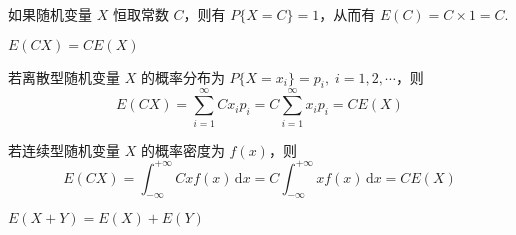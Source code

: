 \begin{myproof}
    如果随机变量 $X$ 恒取常数 $C$，则有 $P\{X=C\}=1$，从而有 $E(C) = C \times 1 = C$.
\end{myproof}

\begin{property} \label{property:E(CX)=CE(X)}
    $E(CX)=CE(X)$
\end{property}

\begin{myproof}
    若离散型随机变量 $X$ 的概率分布为 $P\{X=x_i\}=p_i, \; i=1,2,\cdots$，则
    $$
    E(CX) = \sum_{i=1}^{\infty} C x_i p_i = C \sum_{i=1}^{\infty} x_i p_i = CE(X)
    $$

    若连续型随机变量 $X$ 的概率密度为 $f(x)$，则
    $$
    E(CX) = \int_{-\infty}^{+\infty} Cx f(x) \, \text{d}x = C \int_{-\infty}^{+\infty} x f(x) \, \text{d}x = CE(X)
    $$
\end{myproof}

\begin{property} \label{property:E(X+Y)=E(X)+E(Y)}
    $E(X+Y)=E(X)+E(Y)$
\end{property}

